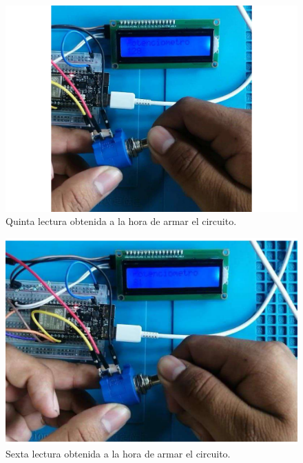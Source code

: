         \begin{figure}[H]
        \centering
        \includegraphics[trim = {50mm 0mm 0mm 0mm},clip,scale=0.3]{19/Img/evidenciaCambio5.pdf}
        \caption{Quinta lectura obtenida a la hora de armar el circuito.}
        \label{fig:evidenciaCambio5}
    \end{figure}
\begin{figure}[H]
        \centering
        \includegraphics[trim = {50mm 0mm 0mm 0mm},clip,scale=0.3]{19/Img/evidenciaCambio6.pdf}
        \caption{Sexta lectura obtenida a la hora de armar el circuito.}
        \label{fig:evidenciaCambio6}
    \end{figure}
